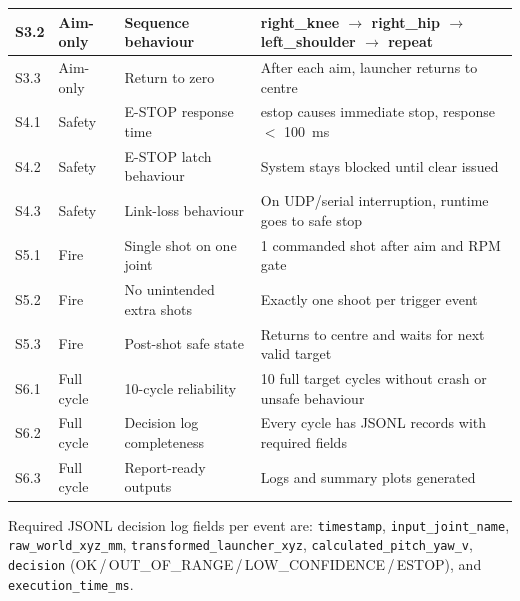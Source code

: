 {\begin{longtable}{|l|l|p{4.5cm}|p{5.5cm}|}
\hline
S3.2 & Aim-only & Sequence behaviour & right\_knee $\to$ right\_hip $\to$ left\_shoulder $\to$ repeat \\
\hline
S3.3 & Aim-only & Return to zero & After each aim, launcher returns to centre \\
\hline
S4.1 & Safety & E-STOP response time & estop causes immediate stop, response $<$ 100~ms \\
\hline
S4.2 & Safety & E-STOP latch behaviour & System stays blocked until clear issued \\
\hline
S4.3 & Safety & Link-loss behaviour & On UDP/serial interruption, runtime goes to safe stop \\
\hline
S5.1 & Fire & Single shot on one joint & 1 commanded shot after aim and RPM gate \\
\hline
S5.2 & Fire & No unintended extra shots & Exactly one shoot per trigger event \\
\hline
S5.3 & Fire & Post-shot safe state & Returns to centre and waits for next valid target \\
\hline
S6.1 & Full cycle & 10-cycle reliability & 10 full target cycles without crash or unsafe behaviour \\
\hline
S6.2 & Full cycle & Decision log completeness & Every cycle has JSONL records with required fields \\
\hline
S6.3 & Full cycle & Report-ready outputs & Logs and summary plots generated \\
\hline
\end{longtable}
}

Required JSONL decision log fields per event are: \texttt{timestamp}, \texttt{input\_joint\_name}, \texttt{raw\_world\_xyz\_mm}, \texttt{transformed\_launcher\_xyz}, \texttt{calculated\_pitch\_yaw\_v}, \texttt{decision} (OK\,/\,OUT\_OF\_RANGE\,/\,LOW\_CONFIDENCE\,/\,ESTOP), and \texttt{execution\_time\_ms}.
